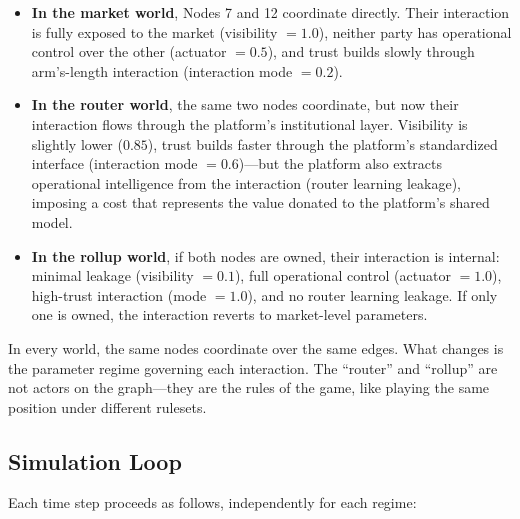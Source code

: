 \documentclass[12pt]{article}
\theoremstyle{definition}
\begin{document}
\begin{itemize}[leftmargin=*]
\item \textbf{In the market world}, Nodes 7 and 12 coordinate directly. Their interaction is fully exposed to the market (visibility $= 1.0$), neither party has operational control over the other (actuator $= 0.5$), and trust builds slowly through arm's-length interaction (interaction mode $= 0.2$).

\item \textbf{In the router world}, the same two nodes coordinate, but now their interaction flows through the platform's institutional layer. Visibility is slightly lower ($0.85$), trust builds faster through the platform's standardized interface (interaction mode $= 0.6$)---but the platform also extracts operational intelligence from the interaction (router learning leakage), imposing a cost that represents the value donated to the platform's shared model.

\item \textbf{In the rollup world}, if both nodes are owned, their interaction is internal: minimal leakage (visibility $= 0.1$), full operational control (actuator $= 1.0$), high-trust interaction (mode $= 1.0$), and no router learning leakage. If only one is owned, the interaction reverts to market-level parameters.
\end{itemize}

\noindent In every world, the same nodes coordinate over the same edges. What changes is the parameter regime governing each interaction. The ``router'' and ``rollup'' are not actors on the graph---they are the rules of the game, like playing the same position under different rulesets.

\subsection{Simulation Loop}

Each time step proceeds as follows, independently for each regime:
\end{document}
